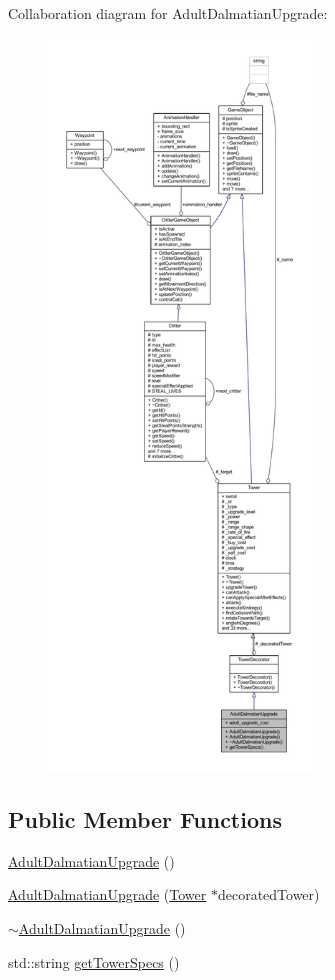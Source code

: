 Collaboration diagram for Adult\+Dalmatian\+Upgrade\+:
\nopagebreak
\begin{figure}[H]
\begin{center}
\leavevmode
\includegraphics[height=550pt]{class_adult_dalmatian_upgrade__coll__graph}
\end{center}
\end{figure}
\subsection*{Public Member Functions}
\begin{DoxyCompactItemize}
\item 
\hyperlink{class_adult_dalmatian_upgrade_aa287bbb9aa3120ac94d8cb00e8277f66}{Adult\+Dalmatian\+Upgrade} ()
\item 
\hyperlink{class_adult_dalmatian_upgrade_a8eba9816fcfc628e2c9310ef2f1ca989}{Adult\+Dalmatian\+Upgrade} (\hyperlink{class_tower}{Tower} $\ast$decorated\+Tower)
\item 
\hyperlink{class_adult_dalmatian_upgrade_a1f0c8f42d4fac3843f506ab77a9272ab}{$\sim$\+Adult\+Dalmatian\+Upgrade} ()
\item 
std\+::string \hyperlink{class_adult_dalmatian_upgrade_a6b6d0c8464ddd845565d72b2e1480183}{get\+Tower\+Specs} ()
\end{DoxyCompactItemize}

